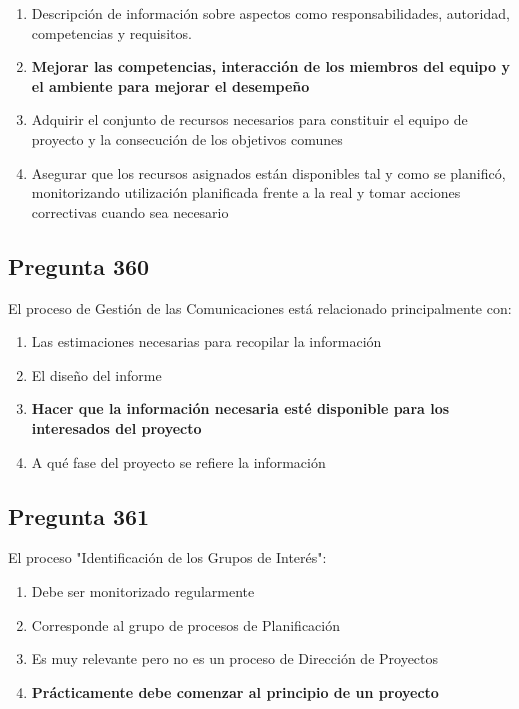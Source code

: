 \documentclass[11pt,a4paper]{article}
\begin{document}
\begin{enumerate}[label=\alph*)]
  \item Descripción de información sobre aspectos como responsabilidades, autoridad, competencias y requisitos.
  \item \textbf{Mejorar las competencias, interacción de los miembros del equipo y el ambiente para mejorar el desempeño}
  \item Adquirir el conjunto de recursos necesarios para constituir el equipo de proyecto y la consecución de los objetivos comunes
  \item Asegurar que los recursos asignados están disponibles tal y como se planificó, monitorizando utilización planificada frente a la real y tomar acciones correctivas cuando sea necesario
\end{enumerate}

\subsection*{Pregunta 360}
El proceso de Gestión de las Comunicaciones está relacionado principalmente con:

\begin{enumerate}[label=\alph*)]
  \item Las estimaciones necesarias para recopilar la información
  \item El diseño del informe
  \item \textbf{Hacer que la información necesaria esté disponible para los interesados del proyecto}
  \item A qué fase del proyecto se refiere la información
\end{enumerate}

\subsection*{Pregunta 361}
El proceso "Identificación de los Grupos de Interés":

\begin{enumerate}[label=\alph*)]
  \item Debe ser monitorizado regularmente
  \item Corresponde al grupo de procesos de Planificación
  \item Es muy relevante pero no es un proceso de Dirección de Proyectos
  \item \textbf{Prácticamente debe comenzar al principio de un proyecto}
\end{enumerate}
\end{document}
